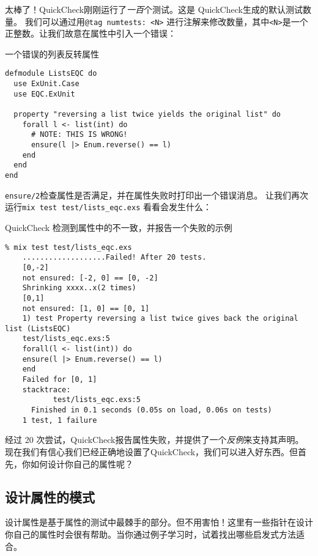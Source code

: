 太棒了！QuickCheck刚刚运行了\emph{一百}个测试。这是 QuickCheck生成的默认测试数量。
我们可以通过用\texttt{@tag numtests: <N>} 进行注解来修改数量，其中\texttt{<N>}是一个正整数。让我们故意在属性中引入一个错误：


\begin{code}{一个错误的列表反转属性}
\begin{verbatim}
defmodule ListsEQC do
  use ExUnit.Case
  use EQC.ExUnit

  property "reversing a list twice yields the original list" do
    forall l <- list(int) do
      # NOTE: THIS IS WRONG!
      ensure(l |> Enum.reverse() == l)
    end
  end
end
\end{verbatim}
\label{lst:a_wrong_list_reversal_property}
\end{code}

\texttt{ensure/2}检查属性是否满足，并在属性失败时打印出一个错误消息。
让我们再次运行\texttt{mix test test/lists\_eqc.exs} 看看会发生什么：

\begin{code}{QuickCheck 检测到属性中的不一致，并报告一个失败的示例}
  \begin{verbatim}
% mix test test/lists_eqc.exs
    ...................Failed! After 20 tests. 
    [0,-2]
    not ensured: [-2, 0] == [0, -2]
    Shrinking xxxx..x(2 times)
    [0,1]
    not ensured: [1, 0] == [0, 1] 
    1) test Property reversing a list twice gives back the original list (ListsEQC) 
    test/lists_eqc.exs:5 
    forall(l <- list(int)) do
    ensure(l |> Enum.reverse() == l)      
    end      
    Failed for [0, 1]        
    stacktrace: 
           test/lists_eqc.exs:5 
      Finished in 0.1 seconds (0.05s on load, 0.06s on tests)
    1 test, 1 failure
\end{verbatim}
\label{lst:quickcheck_detects_inconsistency_and_reports_a_failing_example}
\end{code}

经过 20 次尝试，QuickCheck报告属性失败，并提供了一个\emph{反例}来支持其声明。
现在我们有信心我们已经正确地设置了QuickCheck，我们可以进入好东西。但首先，你如何设计你自己的属性呢？


\subsection{设计属性的模式}

设计属性是基于属性的测试中最棘手的部分。但不用害怕！这里有一些指针在设计你自己的属性时会很有帮助。当你通过例子学习时，试着找出哪些启发式方法适合。

